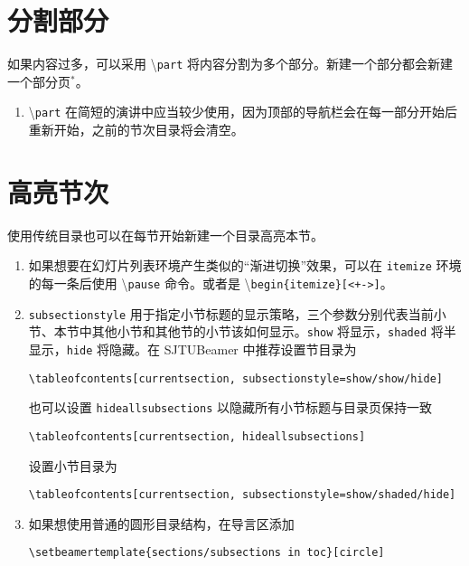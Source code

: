 \documentclass[
    UTF8,
    heading=true,
    12pt,
    a4paper
]{ctexrep}
\newenvironment{commentlist}{\begin{enumerate}\small}{\end{enumerate}}
\newcommand{\cmd}[1]{\textbackslash{}\texttt{#1}}
\newcommand{\env}[1]{\texttt{#1}}
\newcommand{\opt}[1]{\texttt{#1}}
\def\themename{\textsf{SJTUBeamer}}
\begin{document}
\section{分割部分}

如果内容过多，可以采用 \cmd{part} 将内容分割为多个部分。新建一个部分都会新建一个部分页$^*$。


\begin{commentlist}
  \item \cmd{part} 在简短的演讲中应当较少使用，因为顶部的导航栏会在每一部分开始后重新开始，之前的节次目录将会清空。
\end{commentlist}

\section{高亮节次}

使用传统目录也可以在每节开始新建一个目录高亮本节。


\begin{commentlist}
  \item 如果想要在幻灯片列表环境产生类似的“渐进切换”效果，可以在 \env{itemize} 环境的每一条后使用 \cmd{pause} 命令。或者是 \cmd{begin\{itemize\}[<+->]}。
  \item \opt{subsectionstyle} 用于指定小节标题的显示策略，三个参数分别代表当前小节、本节中其他小节和其他节的小节该如何显示。\opt{show} 将显示，\opt{shaded} 将半显示，\opt{hide} 将隐藏。在 \themename{} 中推荐设置节目录为
  \begin{verbatim}\tableofcontents[currentsection, subsectionstyle=show/show/hide]\end{verbatim}
  也可以设置 \opt{hideallsubsections} 以隐藏所有小节标题与目录页保持一致
  \begin{verbatim}\tableofcontents[currentsection, hideallsubsections]\end{verbatim}
  设置小节目录为
  \begin{verbatim}\tableofcontents[currentsection, subsectionstyle=show/shaded/hide]\end{verbatim}
  \item 如果想使用普通的圆形目录结构，在导言区添加
  \begin{verbatim}\setbeamertemplate{sections/subsections in toc}[circle]\end{verbatim}
\end{commentlist}
\end{document}
